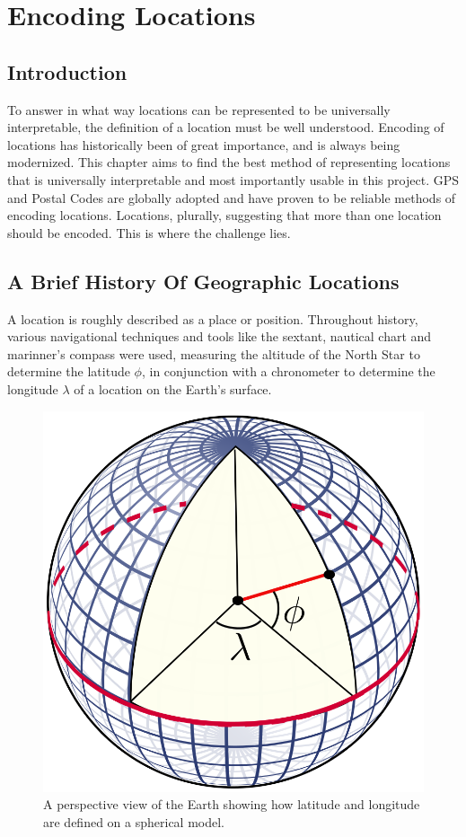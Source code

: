 
\chapter{Encoding Locations}

\ifpdf
  \graphicspath{{Chapter2/Figs/Raster/}{Chapter2/Figs/PDF/}{Chapter2/Figs/}}
\else
  \graphicspath{{Chapter2/Figs/Vector/}{Chapter2/Figs/}}
\fi

\section{Introduction}
To answer in what way locations can be represented to be universally interpretable, the definition of a location must be well understood. Encoding of locations has historically been of great importance, and is always being modernized. This chapter aims to find the best method of representing locations that is universally interpretable and most importantly usable in this project. GPS and Postal Codes are globally adopted and have proven to be reliable methods of encoding locations. Locations, plurally, suggesting that more than one location should be encoded. This is where the challenge lies.

\section{A Brief History Of Geographic Locations}

A location is roughly described as a place or position. Throughout history, various navigational techniques and tools like the sextant, nautical chart and marinner's compass were used, measuring the altitude of the North Star to determine the latitude $\phi$, in conjunction with a chronometer to determine the longitude $\lambda$ of a location on the Earth's surface.

\begin{figure}[htbp!]
  \centering
  \includegraphics[width=.2\textwidth]{LatLngSphere}
  \caption[LatLngSphere]{A perspective view of the Earth showing how latitude and longitude are defined on a spherical model.}
  \label{fig:latlngsphere}
\end{figure}

